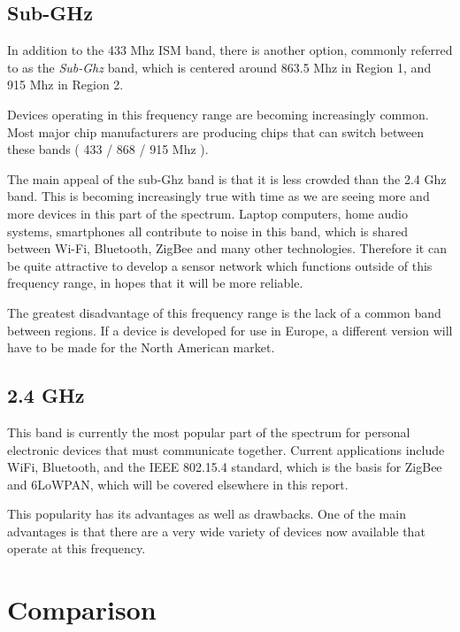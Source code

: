
\subsection{Sub-GHz}

In addition to the 433 Mhz ISM band, there is another option, commonly referred
to as the \emph{Sub-Ghz} band, which is centered around 863.5 Mhz in Region 1,
and 915 Mhz in Region 2.

Devices operating in this frequency range are becoming increasingly common. Most
major chip manufacturers are producing chips that can switch between these bands
( 433 / 868 / 915 Mhz ).

The main appeal of the sub-Ghz band is that it is less crowded than the 2.4 Ghz
band. This is becoming increasingly true with time as we are seeing more and
more devices in this part of the spectrum. Laptop computers, home audio systems,
smartphones all contribute to noise in this band, which is shared between Wi-Fi,
Bluetooth, ZigBee and many other technologies. Therefore it can be quite
attractive to develop a sensor network which functions outside of this frequency
range, in hopes that it will be more reliable.

The greatest disadvantage of this frequency range is the lack of a common band
between regions. If a device is developed for use in Europe, a different version
will have to be made for the North American market.

\subsection{2.4 GHz}

This band is currently the most popular part of the spectrum for personal
electronic devices that must communicate together. Current applications include
WiFi, Bluetooth, and the IEEE 802.15.4 standard, which is the basis for ZigBee
and 6LoWPAN, which will be covered elsewhere in this report.

This popularity has its advantages as well as drawbacks. One of the main
advantages is that there are a very wide variety of devices now available that
operate at this frequency. 


\section{Comparison}

